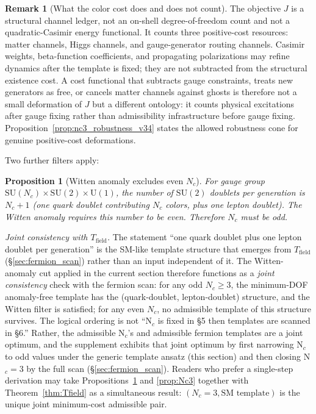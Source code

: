 \documentclass[11pt]{article}
\newtheorem{proposition}[theorem]{Proposition}
\theoremstyle{definition}
\newtheorem{remark}[theorem]{Remark}
\newcommand{\SU}{\mathrm{SU}}
\newcommand{\U}{\mathrm{U}}
\begin{document}
\begin{remark}[What the color cost does and does not count]
\label{rem:color_cost_functional_v35}
The objective $J$ is a structural channel ledger, not an on-shell degree-of-freedom count and not a quadratic-Casimir energy functional.  It counts three positive-cost resources: matter channels, Higgs channels, and gauge-generator routing channels.  Casimir weights, beta-function coefficients, and propagating polarizations may refine dynamics after the template is fixed; they are not subtracted from the structural existence cost.  A cost functional that subtracts gauge constraints, treats new generators as free, or cancels matter channels against ghosts is therefore not a small deformation of $J$ but a different ontology: it counts physical excitations after gauge fixing rather than admissibility infrastructure before gauge fixing.  Proposition~\ref{prop:nc3_robustness_v34} states the allowed robustness cone for genuine positive-cost deformations.
\end{remark}

Two further filters apply:

\begin{proposition}[Witten anomaly excludes even $N_c$]\label{prop:witten}
For gauge group $\SU(N_c) \times \SU(2) \times \U(1)$, the number of
$\SU(2)$ doublets per generation is $N_c + 1$ (one quark doublet
contributing $N_c$ colors, plus one lepton doublet).  The Witten anomaly
\cite{Witten1982} requires this number to be even.  Therefore $N_c$ must
be odd.
\end{proposition}

\noindent\textit{Joint consistency with $T_{\mathrm{field}}$.}\quad
The statement ``one quark doublet plus one lepton doublet per generation''
is the SM-like template structure that emerges from $T_{\mathrm{field}}$
(\S\ref{sec:fermion_scan}) rather than an input independent of it.  The
Witten-anomaly cut applied in the current section therefore functions as
a \emph{joint consistency} check with the fermion scan: for any odd
$N_c \ge 3$, the minimum-DOF anomaly-free template has the (quark-doublet,
lepton-doublet) structure, and the Witten filter is satisfied; for any
even $N_c$, no admissible template of this structure survives.  The
logical ordering is not ``N$_c$ is fixed in \S5 then templates are scanned
in \S6.''  Rather, the admissible N$_c$'s and admissible fermion templates
are a joint optimum, and the supplement exhibits that joint optimum by
first narrowing N$_c$ to odd values under the generic template ansatz
(this section) and then closing N$_c = 3$ by the full scan (\S\ref{sec:fermion_scan}).
Readers who prefer a single-step derivation may take Propositions~\ref{prop:witten}
and \ref{prop:Nc3} together with Theorem~\ref{thm:Tfield} as a simultaneous
result: $(N_c = 3, \text{SM template})$ is the unique joint
minimum-cost admissible pair.
\end{document}
